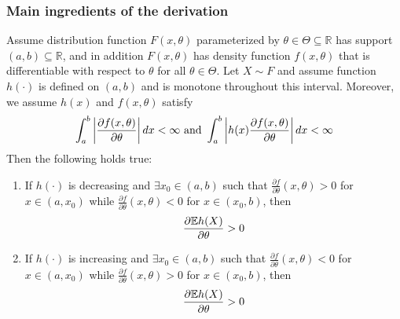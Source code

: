 \documentclass{beamer}
\begin{document}
\begin{frame}
  \frametitle{Main ingredients of the derivation}
  \begin{lemma} \label{lemma:I}
    \begin{scriptsize}
      Assume distribution function $F(x, \theta)$ parameterized by 
      $\theta \in \Theta \subseteq \mathbb R$ has support
      $(a, b) \subseteq \mathbb R$,
      and in addition $F(x, \theta)$ has density
      function $f(x, \theta)$ that is differentiable with respect to
      $\theta$ for all $\theta \in \Theta$.
      Let $X \sim F$ and assume function $h(\cdot)$ is defined on $(a, b)$
      and is monotone throughout this interval.
      Moreover, we assume $h(x)$ and $f(x, \theta)$ satisfy
      \begin{equation}\label{eq:frt}
        \int_a^b \left| {\partial f(x, \theta) \over \partial \theta} \right| dx
        < \infty \text { and }
        \int_a^b \left| h(x) {\partial f(x, \theta) \over \partial \theta} \right| dx
        < \infty
      \end{equation}
      Then the following holds true:
      \begin{enumerate}
      \item If $h(\cdot)$ is decreasing and $\exists x_0 \in (a, b)$ such that
        $\frac{\partial f}{\partial \theta}(x, \theta) > 0$ for $x \in (a, x_0)$ while
        $\frac{\partial f}{\partial \theta}(x, \theta) < 0$ for $x \in (x_0, b)$, then
        \[
        \frac{\partial \mathbb{E} h(X)}{\partial \theta} > 0
        \]
      \item If $h(\cdot)$ is increasing and $\exists x_0 \in (a, b)$ such that 
        $\frac{\partial f}{\partial \theta}(x, \theta) < 0$ for $x \in (a, x_0)$  while
        $\frac{\partial f}{\partial \theta}(x, \theta) > 0$ for $x \in (x_0, b)$, then
        \[
        \frac{\partial \mathbb{E} h(X)}{\partial \theta} > 0
        \]
      \end{enumerate}
    \end{scriptsize}
  \end{lemma}
\end{frame}
\end{document}
